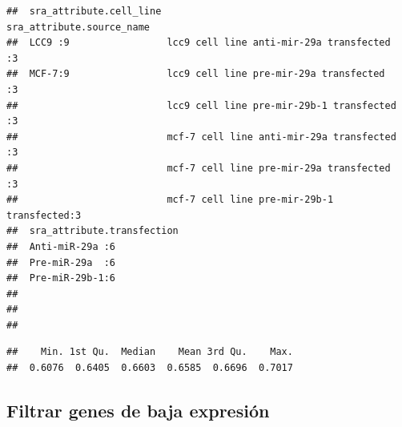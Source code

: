 \documentclass[
]{article}
\newenvironment{Shaded}{\begin{snugshade}}{\end{snugshade}}
\newcommand{\CommentTok}[1]{\textcolor[rgb]{0.56,0.35,0.01}{\textit{#1}}}
\newcommand{\FunctionTok}[1]{\textcolor[rgb]{0.13,0.29,0.53}{\textbf{#1}}}
\newcommand{\NormalTok}[1]{#1}
\newcommand{\OtherTok}[1]{\textcolor[rgb]{0.56,0.35,0.01}{#1}}
\newcommand{\SpecialCharTok}[1]{\textcolor[rgb]{0.81,0.36,0.00}{\textbf{#1}}}
\begin{document}
\begin{verbatim}
##  sra_attribute.cell_line                             sra_attribute.source_name
##  LCC9 :9                 lcc9 cell line anti-mir-29a transfected  :3          
##  MCF-7:9                 lcc9 cell line pre-mir-29a transfected   :3          
##                          lcc9 cell line pre-mir-29b-1 transfected :3          
##                          mcf-7 cell line anti-mir-29a transfected :3          
##                          mcf-7 cell line pre-mir-29a transfected  :3          
##                          mcf-7 cell line pre-mir-29b-1 transfected:3          
##  sra_attribute.transfection
##  Anti-miR-29a :6           
##  Pre-miR-29a  :6           
##  Pre-miR-29b-1:6           
##                            
##                            
## 
\end{verbatim}

\begin{Shaded}
\end{Shaded}

\begin{verbatim}
##    Min. 1st Qu.  Median    Mean 3rd Qu.    Max. 
##  0.6076  0.6405  0.6603  0.6585  0.6696  0.7017
\end{verbatim}

\subsection{Filtrar genes de baja
expresión}\label{filtrar-genes-de-baja-expresiuxf3n}
\end{document}
